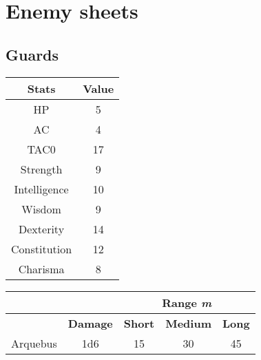 \section{Enemy sheets}
\subsection{Guards}
\begin{table}[H]
  \centering
\begin{tabular}{|c|c|}
\hline
\rowcolor[HTML]{C0C0C0}
\textbf{Stats} & \textbf{Value } \\ \hline
HP & 5 \\ \hline
AC & 4 \\ \hline
TAC0 & 17 \\ \hline
Strength & 9  \\ \hline
Intelligence & 10 \\ \hline
Wisdom & 9 \\ \hline
Dexterity & 14 \\ \hline
Constitution & 12 \\ \hline
Charisma & 8 \\ \hline
\end{tabular}
\end{table}
\begin{table}[H]
  \centering
  \begin{tabular}{ll|c|c|c|}
    \cline{3-5}
     &  & \multicolumn{3}{c|}{\cellcolor[HTML]{C0C0C0}\textbf{Range \textit{m}}} \\ \hline
    \rowcolor[HTML]{C0C0C0}
    \multicolumn{1}{|l|}{\cellcolor[HTML]{C0C0C0}\textbf{Weapon}} & \textbf{Damage} & \multicolumn{1}{l|}{\cellcolor[HTML]{C0C0C0}\textbf{Short}} & \textbf{Medium} & \textbf{Long} \\ \hline
    \multicolumn{1}{|c|}{Arquebus} & \multicolumn{1}{c|}{1d6} & 15 & 30 & 45 \\ \hline
  \end{tabular}
\end{table}


